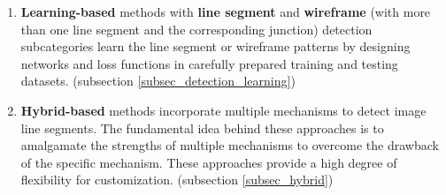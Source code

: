 \documentclass[journal,compsoc]{IEEEtran}
\begin{document}
\begin{enumerate}
	\item \textbf{Learning-based} methods with \textbf{line segment} \cite{Sem-LSD,LearningAttractionFieldRepresentationforRobustLineSegmentDetection,LearningtoCalibrateStraightLinesforFisheyeImageRectification,TP-LSD,LGNN,L2D2,FullyConvolutionalLineParsing,TowardsRealtimeandLightweightLineSegmentDetection,ULSD,WGLSM,SOLD2,Superline,LineSegmentDetectionUsingTransformerswithoutEdges,LearningRegionalAttractionforLineSegmentDetection,ELSD,SelfsupervisedLightweightLineSegmentDetectorandDescriptor} and \textbf{wireframe} (with more than one line segment and the corresponding junction) \cite{LearningtoParseWireframesinImagesofMan-MadeEnvironments,WireframeParsingWithGuidanceofDistanceMap,PPGNet,End-to-EndWireframeParsing, LearningtoReconstruct3DManhattanWireframesFromaSingleImage,Holistically-AttractedWireframeParsing,Hole-robustWireframeDetection,SemanticRoomWireframeDetectionfromaSingleView} detection subcategories learn the line segment or wireframe patterns by designing networks and loss functions in carefully prepared training and testing datasets. (subsection \ref{subsec_detection_learning})
		
	\item \textbf{Hybrid-based} methods \cite{MCMLSD,DeepHoughTransformLinePriors,LinedetectionviaalightweightCNNwithaHoughlayer,LSDNet,DeepLSD} incorporate multiple mechanisms to detect image line segments. The fundamental idea behind these approaches is to amalgamate the strengths of multiple mechanisms to overcome the drawback of the specific mechanism. These approaches provide a high degree of flexibility for customization. (subsection \ref{subsec_hybrid})
\end{enumerate}
\end{document}

